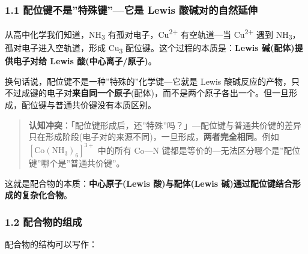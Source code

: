 \subsubsection{1.1 配位键不是''特殊键''---它是 Lewis 酸碱对的自然延伸}\label{ux914dux4f4dux952eux4e0dux662fux7279ux6b8aux952eux5b83ux662f-lewis-ux9178ux78b1ux5bf9ux7684ux81eaux7136ux5ef6ux4f38}

从高中化学我们知道，NH\textsubscript{3} 有孤对电子，Cu\textsuperscript{2+} 有空轨道---当 Cu\textsuperscript{2+} 遇到 NH\textsubscript{3}，孤对电子进入空轨道，形成 Cu\textsubscript{3} 配位键。这个过程的本质是：\textbf{Lewis 碱(配体)提供电子对给 Lewis 酸(中心离子/原子)}。

换句话说，配位键不是一种''特殊的''化学键---它就是 Lewis 酸碱反应的产物，只不过成键的电子对\textbf{来自同一个原子}(配体)，而不是两个原子各出一个。但一旦形成，配位键与普通共价键没有本质区别。

\begin{quote}
\textbf{认知冲突}：「配位键形成后，还''特殊''吗？」---配位键与普通共价键的差异只在形成阶段(电子对的来源不同)，一旦形成，\textbf{两者完全相同}。例如 \([\mathrm{Co(NH_3)_6}]^{3+}\) 中的所有 Co---N 键都是等价的---无法区分哪个是''配位键''哪个是''普通共价键''。
\end{quote}

这就是配合物的本质：\textbf{中心原子(Lewis 酸)与配体(Lewis 碱)通过配位键结合形成的复杂化合物}。

\subsubsection{1.2 配合物的组成}\label{ux914dux5408ux7269ux7684ux7ec4ux6210}

配合物的结构可以写作：

\begin{Shaded}
\begin{Highlighting}[]
\end{Highlighting}
\end{Shaded}

